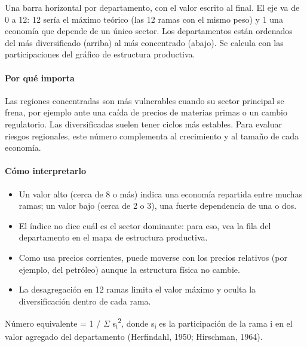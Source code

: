 \begin{leer}
Una barra horizontal por departamento, con el valor escrito al final. El eje va de 0 a 12: 12 sería el máximo teórico (las 12 ramas con el mismo peso) y 1 una economía que depende de un único sector. Los departamentos están ordenados del más diversificado (arriba) al más concentrado (abajo). Se calcula con las participaciones del gráfico de estructura productiva.
\end{leer}

\paragraph{Por qué importa}
Las regiones concentradas son más vulnerables cuando su sector principal se frena, por ejemplo ante una caída de precios de materias primas o un cambio regulatorio. Las diversificadas suelen tener ciclos más estables. Para evaluar riesgos regionales, este número complementa al crecimiento y al tamaño de cada economía.

\paragraph{Cómo interpretarlo}
\begin{itemize}
\item Un valor alto (cerca de 8 o más) indica una economía repartida entre muchas ramas; un valor bajo (cerca de 2 o 3), una fuerte dependencia de una o dos.
\item El índice no dice cuál es el sector dominante: para eso, vea la fila del departamento en el mapa de estructura productiva.
\item Como usa precios corrientes, puede moverse con los precios relativos (por ejemplo, del petróleo) aunque la estructura física no cambie.
\item La desagregación en 12 ramas limita el valor máximo y oculta la diversificación dentro de cada rama.
\end{itemize}
\begin{formulas}[Fórmulas]
\end{formulas}
\begin{metodo}[Metodología]
Número equivalente = 1 / $\Sigma$ s\textsubscript{i}\textsuperscript{2}, donde s\textsubscript{i} es la participación de la rama i en el valor agregado del departamento (Herfindahl, 1950; Hirschman, 1964).
\par{}
\end{metodo}

